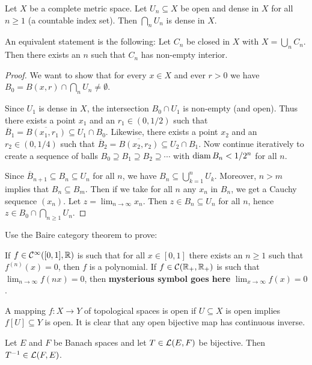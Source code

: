 \begin{thm}
	Let $X$ be a complete metric space.
	Let $U_n \subseteq X$ be open and dense in $X$ for all $n \geq 1$ (a countable index set).
	Then $\bigcap_n U_n$ is dense in $X$.
	
	An equivalent statement is the following:
	Let $C_n$ be closed in $X$ with $X=\bigcup_n C_n$.
	Then there exists an $n$ such that $C_n$ has non-empty interior.
\end{thm}

\begin{proof}
	We want to show that for every $x \in X$ and ever $r>0$ we have $B_0 = B(x,r) \cap \bigcap_n U_n \neq \emptyset$.
	
	Since $U_1$ is dense in $X$, the intersection $B_0 \cap U_1$ is non-empty (and open).
	Thus there exists a point $x_1$ and an $r_1 \in (0,1/2)$ such that $\overline{B}_1 = \overline{B(x_1,r_1)} \subseteq U_1 \cap B_0$.
	Likewise, there exists a point $x_2$ and an $r_2 \in (0,1/4)$ such that $\overline{B}_2 = \overline{B(x_2,r_2)} \subseteq U_2 \cap B_1$.
	Now continue iteratively to create a sequence of balls $B_0 \supseteq B_1 \supseteq B_2 \supseteq \cdots$ with $\operatorname{diam} B_n < 1/2^n$ for all $n$.
	
	Since $\overline{B}_{n+1} \subseteq B_n \subseteq U_n$ for all $n$, we have $B_n \subseteq \bigcup_{k=1}^n U_k$.
	Moreover, $n>m$ implies that $B_n \subseteq B_m$.
	Then if we take for all $n$ any $x_n$ in $B_n$, we get a Cauchy sequence $(x_n)$.
	Let $z  = \lim_{n \to \infty} x_n$.
	Then $z \in B_n \subseteq U_n$ for all $n$, hence $z \in B_0 \cap \bigcap_{n \geq 1} U_n$.
\end{proof}

\begin{exer}
	Use the Baire category theorem to prove:
	\begin{enum}
		\io
		If $f \in \mathcal{C}^\infty([0,1],\mathbb{R})$ is such that for all $x \in [0,1]$ there exists an $n \geq 1$ such that $f^{(n)}(x)=0$, then $f$ is a polynomial.
		\io
		If $f \in \mathcal{C}(\mathbb{R}_+,\mathbb{R}_+)$ is such that $\lim_{n \to \infty} f(nx)=0$, then \textbf{mysterious symbol goes here} $\lim_{x \to \infty} f(x) = 0$.
	\end{enum}
\end{exer}

\begin{defn}
	A mapping $f: X \to Y$ of topological spaces is open if $U \subseteq X$ is open implies $f[U] \subseteq Y$ is open.
	It is clear that any open bijective map has continuous inverse.
\end{defn}

\begin{thm}
	Let $E$ and $F$ be Banach spaces and let $T \in \mathcal{L}(E,F)$ be bijective.
	Then $T^{-1} \in \mathcal{L}(F,E)$.
\end{thm}
